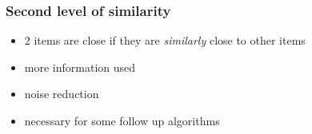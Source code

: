 \documentclass[xcolor=svgnames]{beamer}
\begin{document}
\begin{frame}
    \frametitle{Second level of similarity}
    \Large
    \begin{itemize}
        \item 2 items are close if they are \emph{similarly} close to other items
        \item more information used
        \item noise reduction
        \item necessary for some follow up algorithms
    \end{itemize}
\end{frame}
\end{document}

